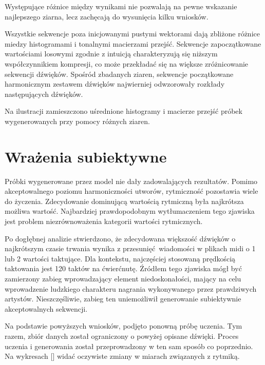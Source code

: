 {{        Występujące różnice między wynikami nie pozwalają na pewne wskazanie najlepszego ziarna, lecz 
        zachęcają do wysunięcia kilku wniosków.

        Wszystkie sekwencje poza inicjowanymi pustymi wektorami dają zbliżone różnice miedzy histogramami i 
        tonalnymi macierzami przejść. 
        Sekwencje zapoczątkowane wartościami losowymi zgodnie z intuicją charakteryzują się niższym współczynnikiem
        kompresji, co może przekładać się na większe zróżnicowanie sekwencji dźwięków.
        Spośród zbadanych ziaren, sekwencje początkowane harmonicznym zestawem dźwięków najwierniej
        odwzorowały rozkłady następujących dźwięków.
        
        Na ilustracji zamieszczono uśrednione histogramy i macierze przejść próbek wygenerowanych przy pomocy różnych ziaren.

    }

    \section{Wrażenia subiektywne}
    {
        Próbki wygenerowane przez model nie dały zadowalających rezultatów. Pomimo akceptowalnego poziomu 
        harmoniczności utworów, rytmiczność pozostawia wiele do życzenia. Zdecydowanie dominującą wartością 
        rytmiczną była najkrótsza możliwa wartość. Najbardziej prawdopodobnym wytłumaczeniem tego zjawiska jest 
        problem niezrównoważenia kategorii wartości rytmicznych. 

        Po dogłębnej analizie stwierdzono, że zdecydowana większość dźwięków o najkrótszym czasie trwania
        wynika z przesunięć wiadomości w plikach midi o 1 lub 2 wartości taktujące. Dla kontekstu, najczęściej stosowaną
        prędkością taktowania jest 120 taktów na ćwierćnutę. Źródłem tego zjawiska mógł być zamierzony 
        zabieg wprowadzający element niedoskonałości, mający na celu wprowadzenie ludzkiego charakteru nagrania 
        wykonywanego przez prawdziwych artystów.
        Nieszczęśliwie, zabieg ten uniemożliwił generowanie subiektywnie akceptowalnych sekwencji.

        Na podstawie powyższych wniosków, podjęto ponowną próbę uczenia. Tym razem, zbiór danych został
        ograniczony o powyżej opisane dźwięki. Proces uczenia i generowania został przeprowadzony w ten sam sposób
        co poprzednio. Na wykresach [] widać oczywiste zmiany w miarach związanych z rytmiką.

}}
